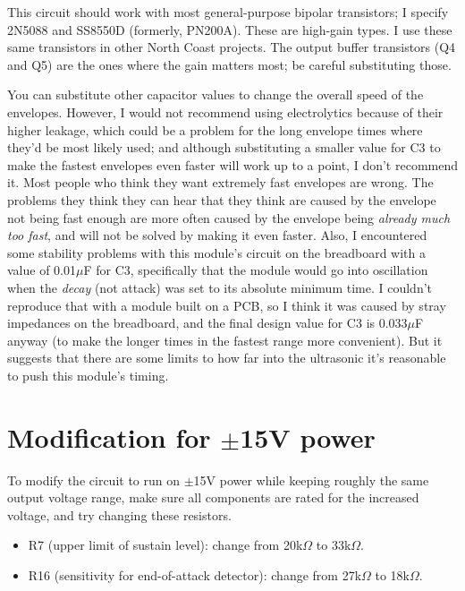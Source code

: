 This circuit should work with most general-purpose bipolar transistors; I
specify 2N5088 and SS8550D (formerly, PN200A).  These are high-gain types. 
I use these same transistors in other North Coast projects.  The output
buffer transistors (Q4 and Q5) are the ones where the gain matters most; be
careful substituting those.

You can substitute other capacitor values to change the overall speed of the
envelopes.  However, I would not recommend using electrolytics because of
their higher leakage, which could be a problem for the long envelope times
where they'd be most likely used; and although substituting a smaller value
for C3 to make the fastest envelopes even faster will work up to a point, I
don't recommend it.  Most people who think they want extremely fast
envelopes are wrong.  The problems they think they can hear that they think
are caused by the envelope not being fast enough are more often caused by
the envelope being \emph{already much too fast}, and will not be solved by
making it even faster.  Also, I encountered some stability problems with
this module's circuit on the breadboard with a value of 0.01$\mu$F for C3,
specifically that the module would go into oscillation when the
\emph{decay} (not attack) was set to its absolute minimum time.  I
couldn't reproduce that with a module built on a PCB, so I think it was
caused by stray impedances on the breadboard, and the final design value for
C3 is 0.033$\mu$F anyway (to make the longer times in the fastest range more
convenient).  But it suggests that there are some limits to how far into the
ultrasonic it's reasonable to push this module's timing.

\section{Modification for $\pm$15V power}

To modify the circuit to run on $\pm$15V power while keeping roughly the
same output voltage range, make sure all components are rated for the
increased voltage, and try changing these resistors.

\begin{itemize}
\item R7 (upper limit of sustain level):  change from 20k$\Omega$ to
  33k$\Omega$.
\item R16 (sensitivity for end-of-attack detector):  change from 27k$\Omega$
  to 18k$\Omega$.
\end{itemize}

